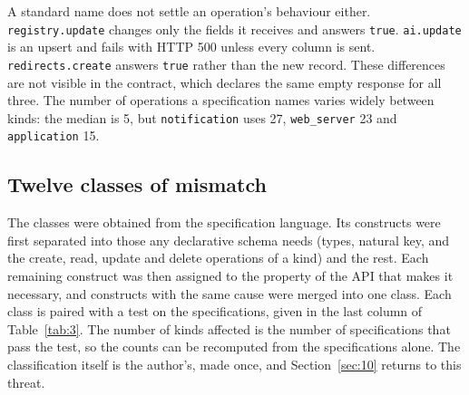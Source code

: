 A standard name does not settle an operation's behaviour either. \texttt{registry.update} changes only the
fields it receives and answers \texttt{true}. \texttt{ai.update} is an upsert and fails with HTTP 500 unless every
column is sent. \texttt{redirects.create} answers \texttt{true} rather than the new record. These differences are not visible in the contract, which declares the same empty response for all three.
The number of operations a specification names varies widely between kinds: the median is 5, but
\texttt{notification} uses 27, \texttt{web\_server} 23 and \texttt{application} 15.

\subsection{Twelve classes of mismatch}\label{sec:3.3}

The classes were obtained from the specification language. Its constructs were first separated into
those any declarative schema needs (types, natural key, and the create, read, update and delete
operations of a kind) and the rest. Each remaining construct was then assigned to the property of the
API that makes it necessary, and constructs with the same cause were merged into one class. Each class
is paired with a test on the specifications, given in the last column of Table~\ref{tab:3}. The number of kinds
affected is the number of specifications that pass the test, so the counts can be recomputed from the
specifications alone. The classification itself is the author's, made once, and Section~\ref{sec:10} returns to
this threat.

